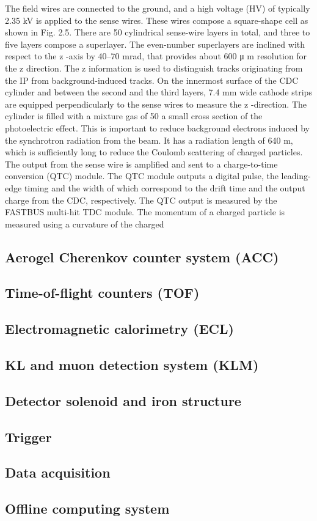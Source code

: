 \documentclass[headings=standardclasses,headings=big,oneside,a4paper,openany,12pt]{scrbook}
\begin{document}
  The field wires are connected to the ground, and a high
voltage (HV) of typically 2.35 kV is applied to the sense wires.  These wires compose a
square-shape cell as shown in Fig. 2.5.  There are 50 cylindrical sense-wire layers in total,
and three to five layers compose a superlayer.  The even-number superlayers are inclined
with respect to the
z
-axis by 40–70 mrad, that provides about 600
μ
m resolution for the
z
direction.  The
z
information is used to distinguish tracks originating from the IP from
background-induced tracks.  On the innermost surface of the CDC cylinder and between
the second and the third layers, 7.4 mm wide cathode strips are equipped perpendicularly
to the sense wires to measure the
z
-direction.
The cylinder is filled with a mixture gas of 50%
a small cross section of the photoelectric effect.  This is important to reduce background
electrons induced by the synchrotron radiation from the beam.  It has a radiation length
of 640 m, which is sufficiently long to reduce the Coulomb scattering of charged particles.
The output from the sense wire is amplified and sent to a charge-to-time conversion
(QTC) module.  The QTC module outputs a digital pulse, the leading-edge timing and
the width of which correspond to the drift time and the output charge from the CDC,
respectively.  The QTC output is measured by the FASTBUS multi-hit TDC module.
The momentum of a charged particle is measured using a curvature of the charged

\subsection{Aerogel Cherenkov counter system (ACC)}
\subsection{Time-of-flight counters (TOF)}
\subsection{Electromagnetic calorimetry (ECL)}
\subsection{KL and muon detection system (KLM)}
\subsection{Detector solenoid and iron structure}
\subsection{Trigger}
\subsection{Data acquisition}
\subsection{Offline computing system}

\printbibliography
\end{document}
